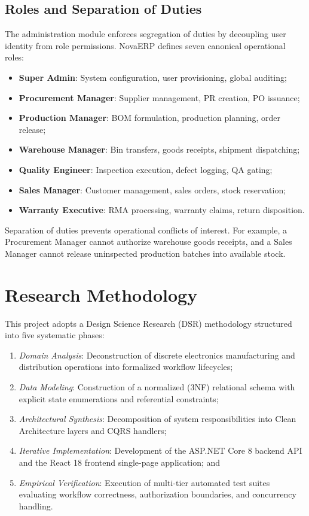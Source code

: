 \documentclass[conference]{IEEEtran}
\begin{document}
\subsection{Roles and Separation of Duties}
The administration module enforces segregation of duties by decoupling user identity from role permissions. NovaERP defines seven canonical operational roles:
\begin{itemize}
    \item \textbf{Super Admin}: System configuration, user provisioning, global auditing;
    \item \textbf{Procurement Manager}: Supplier management, PR creation, PO issuance;
    \item \textbf{Production Manager}: BOM formulation, production planning, order release;
    \item \textbf{Warehouse Manager}: Bin transfers, goods receipts, shipment dispatching;
    \item \textbf{Quality Engineer}: Inspection execution, defect logging, QA gating;
    \item \textbf{Sales Manager}: Customer management, sales orders, stock reservation;
    \item \textbf{Warranty Executive}: RMA processing, warranty claims, return disposition.
\end{itemize}

Separation of duties prevents operational conflicts of interest. For example, a Procurement Manager cannot authorize warehouse goods receipts, and a Sales Manager cannot release uninspected production batches into available stock.

\section{Research Methodology}
This project adopts a Design Science Research (DSR) methodology structured into five systematic phases:
\begin{enumerate}
    \item \textit{Domain Analysis}: Deconstruction of discrete electronics manufacturing and distribution operations into formalized workflow lifecycles;
    \item \textit{Data Modeling}: Construction of a normalized (3NF) relational schema with explicit state enumerations and referential constraints;
    \item \textit{Architectural Synthesis}: Decomposition of system responsibilities into Clean Architecture layers and CQRS handlers;
    \item \textit{Iterative Implementation}: Development of the ASP.NET Core 8 backend API and the React 18 frontend single-page application; and
    \item \textit{Empirical Verification}: Execution of multi-tier automated test suites evaluating workflow correctness, authorization boundaries, and concurrency handling.
\end{enumerate}
\end{document}
